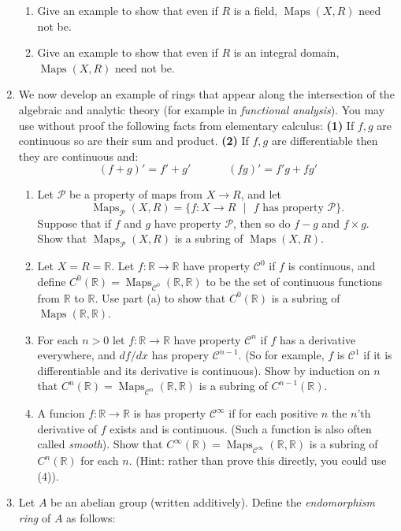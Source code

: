 \documentclass[11pt]{article}
\newcommand{\maps}{\operatorname{Maps}}
\newcommand{\bR}{\mathbb{R}}
\newcommand{\sC}{\mathscr{C}}
\newcommand{\sP}{\mathscr{P}}
\begin{document}
\begin{enumerate}
{\begin{enumerate}
{    }
    \item{
    Give an example to show that even if $R$ is a field, $\maps(X,R)$ need not be.
    }
    \item{
    Give an example to show that even if $R$ is an integral domain, $\maps(X,R)$ need not be.
    }
  \end{enumerate}
  }
  \item{
  We now develop an example of rings that appear along the intersection of the algebraic and analytic theory (for example in \textit{functional analysis}).  You may use without proof the following facts from elementary calculus: \textbf{(1)} If $f,g$ are continuous so are their sum and product.  \textbf{(2)} If $f,g$ are differentiable then they are continuous and:
  \[(f+g)' = f'+g'\hspace{40pt}(fg)' = f'g+fg'\]
  \begin{enumerate}
    \item{
    Let $\sP$ be a property of maps from $X\to R$, and let
    \[\maps_\sP(X,R) = \{f:X\to R\text{ }|\text{ }f\text{ has property }\sP\}.\]
    Suppose that if $f$ and $g$ have property $\sP$, then so do $f-g$ and $f\times g$.  Show that $\maps_\sP(X,R)$ is a subring of $\maps(X,R)$.
    }
    \item{
    Let $X = R = \bR$.  Let $f:\bR\to\bR$ have property $\sC^0$ if $f$ is continuous, and define $C^0(\bR) = \maps_{\sC^0}(\bR,\bR)$ to be the set of continuous functions from $\bR$ to $\bR$.  Use part (a) to show that $C^0(\bR)$ is a subring of $\maps(\bR,\bR)$.
    }
    \item{
    For each $n>0$ let $f:\bR\to\bR$ have property $\sC^n$ if $f$ has a derivative everywhere, and $df/dx$ has propery $\sC^{n-1}$.  (So for example, $f$ is $\sC^1$ if it is differentiable and its derivative is continuous). Show by induction on $n$ that $C^n(\bR) = \maps_{\sC^n}(\bR,\bR)$ is a subring of $C^{n-1}(\bR)$.
    }
    \item{
    A funcion $f:\bR\to\bR$ is has property $\sC^\infty$ if for each positive $n$ the $n$'th derivative of $f$ exists and is continuous.  (Such a function is also often called \textit{smooth}).  Show that $C^\infty(\bR) = \maps_{\sC^{\infty}}(\bR,\bR)$ is a subring of $C^{n}(\bR)$ for each $n$.  (Hint: rather than prove this directly, you could use (4)).
    }
  \end{enumerate}
  }
  \item{
  Let $A$ be an abelian group (written additively).  Define the \textit{endomorphism ring} of $A$ as follows:
}
\end{enumerate}
\end{document}
